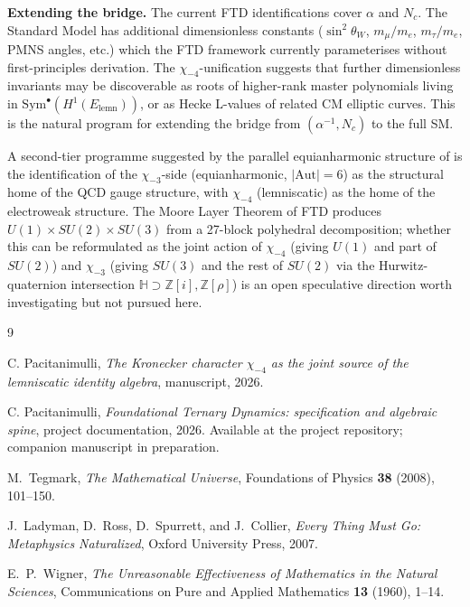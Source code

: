 \documentclass[11pt]{amsart}
\theoremstyle{plain}
\theoremstyle{definition}
\theoremstyle{remark}
\newcommand{\Z}{\mathbb{Z}}
\newcommand{\Aut}{\mathrm{Aut}}
\begin{document}
\textbf{Extending the bridge.} The current FTD identifications cover
$\alpha$ and $N_{c}$. The Standard Model has additional dimensionless
constants ($\sin^{2}\theta_{W}$, $m_{\mu}/m_{e}$, $m_{\tau}/m_{e}$,
PMNS angles, etc.) which the FTD framework currently parameterises
without first-principles derivation. The $\chi_{-4}$-unification suggests
that further dimensionless invariants may be discoverable as roots of
higher-rank master polynomials living in $\mathrm{Sym}^{\bullet}(H^{1}(E_{\mathrm{lemn}}))$,
or as Hecke L-values of related CM elliptic curves. This is the natural
program for extending the bridge from $(\alpha^{-1}, N_{c})$ to the full SM.

A second-tier programme suggested by the parallel equianharmonic structure
of \cite[\S 16.4]{paper-gstar-A} is the identification of the
$\chi_{-3}$-side (equianharmonic, $|\Aut| = 6$) as the structural home
of the QCD gauge structure, with $\chi_{-4}$ (lemniscatic) as the home
of the electroweak structure. The Moore Layer Theorem of FTD
\cite{ftd-spec} produces $U(1) \times SU(2) \times SU(3)$ from a
27-block polyhedral decomposition; whether this can be reformulated as
the joint action of $\chi_{-4}$ (giving $U(1)$ and part of $SU(2)$) and
$\chi_{-3}$ (giving $SU(3)$ and the rest of $SU(2)$ via the
Hurwitz-quaternion intersection $\mathbb{H} \supset \Z[i], \Z[\rho]$)
is an open speculative direction worth investigating but not pursued
here.

\begin{thebibliography}{9}

C. Pacitanimulli,
\textit{The Kronecker character $\chi_{-4}$ as the joint source of the
lemniscatic identity algebra},
manuscript, 2026.

C. Pacitanimulli,
\textit{Foundational Ternary Dynamics: specification and algebraic spine},
project documentation, 2026.
Available at the project repository; companion manuscript in preparation.

M.\ Tegmark,
\textit{The Mathematical Universe},
Foundations of Physics \textbf{38} (2008), 101--150.

J.\ Ladyman, D.\ Ross, D.\ Spurrett, and J.\ Collier,
\emph{Every Thing Must Go: Metaphysics Naturalized},
Oxford University Press, 2007.

E.\ P.\ Wigner,
\textit{The Unreasonable Effectiveness of Mathematics in the Natural
Sciences},
Communications on Pure and Applied Mathematics \textbf{13} (1960), 1--14.

\end{thebibliography}
\end{document}
